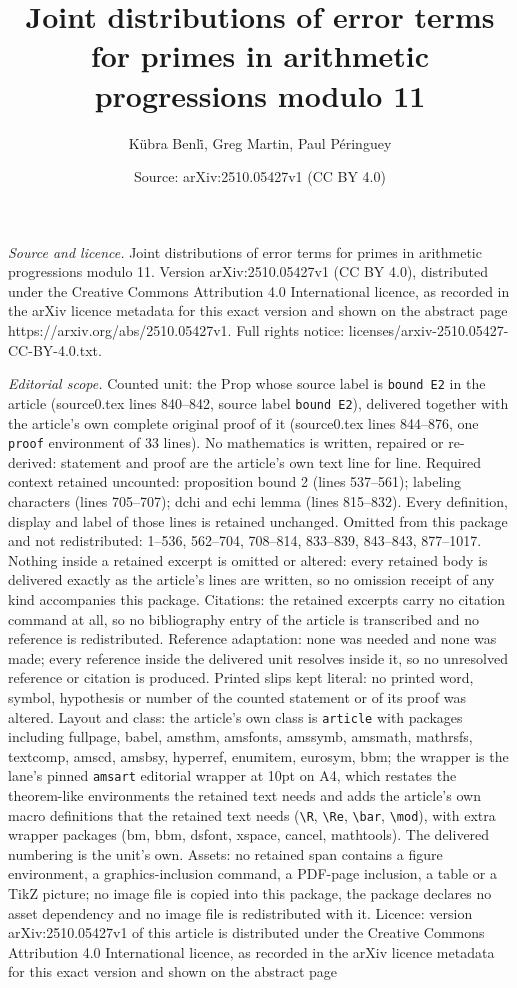 \documentclass[10pt,a4paper]{amsart}
\title[Joint distributions of error terms for primes in arithmetic ]{Joint distributions of error terms for primes in arithmetic progressions modulo 11}
\author{K\"ubra Benl\.i, Greg Martin, Paul P\'eringuey}
\date{Source: arXiv:2510.05427v1 (CC BY 4.0)}
\begin{document}
\maketitle

\noindent\emph{Source and licence.} Joint distributions of error terms for primes in arithmetic progressions modulo 11. Version arXiv:2510.05427v1 (CC BY 4.0), distributed under the Creative Commons Attribution 4.0 International licence, as recorded in the arXiv licence metadata for this exact version and shown on the abstract page https://arxiv.org/abs/2510.05427v1. Full rights notice: licenses/arxiv-2510.05427-CC-BY-4.0.txt.\par\smallskip

\noindent\textit{Editorial scope.} Counted unit: the Prop whose source label is \texttt{bound E2} in the article (source0.tex lines 840--842, source label \texttt{bound E2}), delivered together with the article's own complete original proof of it (source0.tex lines 844--876, one \texttt{proof} environment of 33 lines). No mathematics is written, repaired or re-derived: statement and proof are the article's own text line for line. Required context retained uncounted: proposition bound 2 (lines 537--561); labeling characters (lines 705--707); dchi and echi lemma (lines 815--832). Every definition, display and label of those lines is retained unchanged. Omitted from this package and not redistributed: 1--536, 562--704, 708--814, 833--839, 843--843, 877--1017. Nothing inside a retained excerpt is omitted or altered: every retained body is delivered exactly as the article's lines are written, so no omission receipt of any kind accompanies this package. Citations: the retained excerpts carry no citation command at all, so no bibliography entry of the article is transcribed and no reference is redistributed. Reference adaptation: none was needed and none was made; every reference inside the delivered unit resolves inside it, so no unresolved reference or citation is produced. Printed slips kept literal: no printed word, symbol, hypothesis or number of the counted statement or of its proof was altered. Layout and class: the article's own class is \texttt{article} with packages including fullpage, babel, amsthm, amsfonts, amssymb, amsmath, mathrsfs, textcomp, amscd, amsbsy, hyperref, enumitem, eurosym, bbm; the wrapper is the lane's pinned \texttt{amsart} editorial wrapper at 10pt on A4, which restates the theorem-like environments the retained text needs and adds the article's own macro definitions that the retained text needs (\texttt{\textbackslash R}, \texttt{\textbackslash Re}, \texttt{\textbackslash bar}, \texttt{\textbackslash mod}), with extra wrapper packages (bm, bbm, dsfont, xspace, cancel, mathtools). The delivered numbering is the unit's own. Assets: no retained span contains a figure environment, a graphics-inclusion command, a PDF-page inclusion, a table or a TikZ picture; no image file is copied into this package, the package declares no asset dependency and no image file is redistributed with it. Licence: version arXiv:2510.05427v1 of this article is distributed under the Creative Commons Attribution 4.0 International licence, as recorded in the arXiv licence metadata for this exact version and shown on the abstract page 
\end{document}
